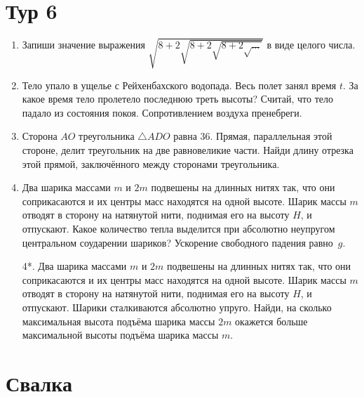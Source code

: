\documentclass[12pt]{article} %
\begin{document}
\section*{Тур 6}

\begin{enumerate}
\item Запиши значение выражения $\sqrt{8 + 2\sqrt{8 + 2\sqrt{8 + 2\sqrt{\ldots}}}}$ в виде целого числа.

\item Тело упало в ущелье с Рейхенбахского водопада. Весь полет занял время $t$. 
За какое время тело пролетело последнюю треть высоты? Считай, что тело падало из состояния покоя. 
Сопротивлением воздуха пренебреги.

\item Сторона $AO$ треугольника $\bigtriangleup ADO$ равна 36. Прямая, параллельная этой стороне, 
делит треугольник на две равновеликие части. Найди длину отрезка этой прямой, заключённого между сторонами треугольника.

\item Два шарика массами $m$ и $2m$ подвешены на длинных нитях так, что они соприкасаются и
их центры масс находятся на одной высоте. Шарик массы $m$ отводят в сторону на натянутой нити, 
поднимая его на высоту $H$, и отпускают. 
Какое количество тепла выделится при абсолютно неупругом центральном соударении шариков? 
Ускорение свободного падения равно~$g$.

\item[4*.] Два шарика массами $m$ и $2m$ подвешены на длинных нитях так, 
что они соприкасаются и их центры масс находятся на одной высоте. 
Шарик массы $m$ отводят в сторону на натянутой нити, поднимая его на высоту $H$, и отпускают. 
Шарики сталкиваются абсолютно упруго. 
Найди, на сколько максимальная высота подъёма шарика массы $2 m$ окажется больше максимальной высоты подъёма шарика массы $m$.


\end{enumerate}
    


\section*{Свалка}
\end{document}
